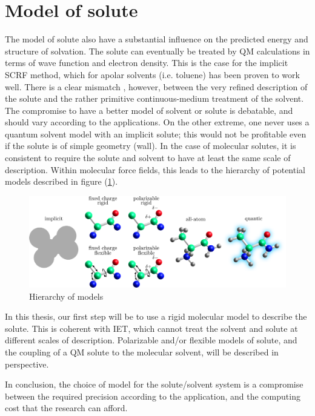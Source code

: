 \section{Model of solute}

The model of solute also have a substantial influence on the predicted
energy and structure of solvation. The solute can eventually be treated
by \acs{QM} calculations in terms of wave function and electron density.
This is the case for the implicit SCRF method, which for apolar solvents
(i.e. toluene) has been proven to work well. There is a clear mismatch
, however, between the very refined description of the solute and
the rather primitive continuous-medium treatment of the solvent. The
compromise to have a better model of solvent or solute is debatable,
and should vary according to the applications. On the other extreme,
 one never uses a quantum solvent model with an implicit
solute; this would not be profitable even if the solute is of simple
geometry (wall). In the case of molecular solutes, it is consistent
to require the solute and solvent to have at least the same scale
of description. Within molecular force fields, this leads to the hierarchy
of potential models described in figure (\ref{fig:Hierarchy-of-models}).
\begin{figure}[h]
\centering{}%
\noindent\begin{minipage}[t]{1\columnwidth}%
\begin{center}
\includegraphics[width=1\columnwidth]{_figure/solute}
\par\end{center}%
\end{minipage}\caption{Hierarchy of models\label{fig:Hierarchy-of-models}}
\end{figure}

In this thesis, our first step will be to use a rigid molecular model
to describe the solute. This is coherent with IET, which cannot treat
the solvent and solute at different scales of description. Polarizable
and/or flexible models of solute, and the coupling of a QM solute
to the molecular solvent, will be described in perspective.

In conclusion, the choice of model for the solute/solvent
system is a compromise between the required precision according to
the application, and the computing cost that the research can afford.
